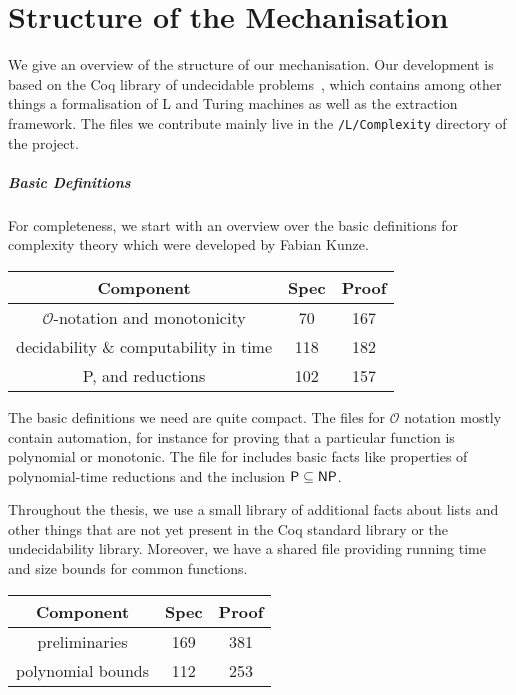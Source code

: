 \chapter{Structure of the Mechanisation}\label{app:mecha}
We give an overview of the structure of our mechanisation. Our development is based on the Coq library of undecidable problems~\cite{coq_undec}, which contains among other things a formalisation of L and Turing machines as well as the extraction framework. 
The files we contribute mainly live in the \texttt{/L/Complexity} directory of the project.

\paragraph{Basic Definitions}
For completeness, we start with an overview over the basic definitions for complexity theory which were developed by Fabian Kunze. 
\begin{center}
  \begin{tabular}{ccc}
    Component & Spec & Proof \\
    \midrule
    $\mathcal{O}$-notation and monotonicity & 70 & 167  \\ %
    decidability \& computability in time & 118 & 182 \\ %
    \textsf{P}, \NP{} and reductions & 102 & 157 %
  \end{tabular}
\end{center}
The basic definitions we need are quite compact. The files for $\mathcal{O}$ notation mostly contain automation, for instance for proving that a particular function is polynomial or monotonic.
The file for \NP{} includes basic facts like properties of polynomial-time reductions and the inclusion $\textsf{P} \subseteq \textsf{NP}{}$.

Throughout the thesis, we use a small library of additional facts about lists and other things that are not yet present in the Coq standard library or the undecidability library. 
Moreover, we have a shared file providing running time and size bounds for common functions.
\begin{center}
  \begin{tabular}{ccc}
    Component & Spec & Proof \\
    \midrule
    preliminaries & 169 & 381 \\
    polynomial bounds & 112 & 253
  \end{tabular}
\end{center}


